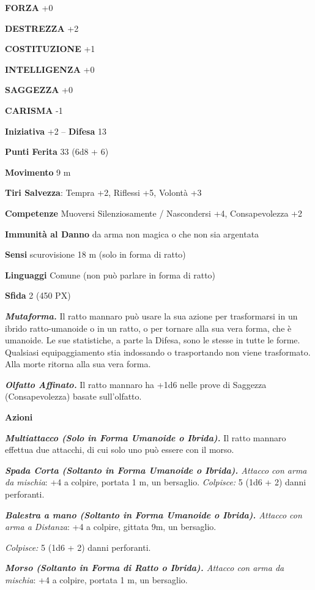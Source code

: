 \begin{multicols}{2}
\textbf{FORZA} +0

\textbf{DESTREZZA} +2

\textbf{COSTITUZIONE} +1

\textbf{INTELLIGENZA} +0

\textbf{SAGGEZZA} +0

\textbf{CARISMA} -1

\textbf{Iniziativa} +2 -- \textbf{Difesa} 13

\textbf{Punti Ferita} 33 (6d8 + 6)

\textbf{Movimento} 9 m

\textbf{Tiri Salvezza}: Tempra +2, Riflessi +5, Volontà +3

\textbf{Competenze} Muoversi Silenziosamente / Nascondersi +4, Consapevolezza +2

\textbf{Immunità al Danno} da arma non magica o che non sia argentata

\textbf{Sensi} scurovisione 18 m (solo in forma di ratto)

\textbf{Linguaggi} Comune (non può parlare in forma di ratto)

\textbf{Sfida} 2 (450 PX)

\textit{\textbf{Mutaforma.}} Il ratto mannaro può usare la sua azione per trasformarsi in un ibrido ratto-umanoide o in un ratto, o per tornare alla sua vera forma, che è umanoide. Le sue statistiche, a parte la Difesa, sono le stesse in tutte le forme. Qualsiasi equipaggiamento stia indossando o trasportando non viene trasformato. Alla morte ritorna alla sua vera forma.

\textit{\textbf{Olfatto Affinato.}} Il ratto mannaro ha +1d6 nelle prove di Saggezza (Consapevolezza) basate sull'olfatto.

\textbf{Azioni}

\textit{\textbf{Multiattacco (Solo in Forma Umanoide o Ibrida).}} Il ratto mannaro effettua due attacchi, di cui solo uno può essere con il morso.

\textit{\textbf{Spada Corta (Soltanto in Forma Umanoide o Ibrida).} Attacco con arma da mischia}: +4 a colpire, portata 1 m, un bersaglio. \textit{Colpisce:} 5 (1d6 + 2) danni perforanti.

\textit{\textbf{Balestra a mano (Soltanto in Forma Umanoide o Ibrida).} Attacco con arma a Distanza}: +4 a colpire, gittata 9m, un bersaglio.

\textit{Colpisce:} 5 (1d6 + 2) danni perforanti.

\textit{\textbf{Morso (Soltanto in Forma di Ratto o Ibrida).} Attacco con arma da mischia}: +4 a colpire, portata 1 m, un bersaglio.


\end{multicols}
